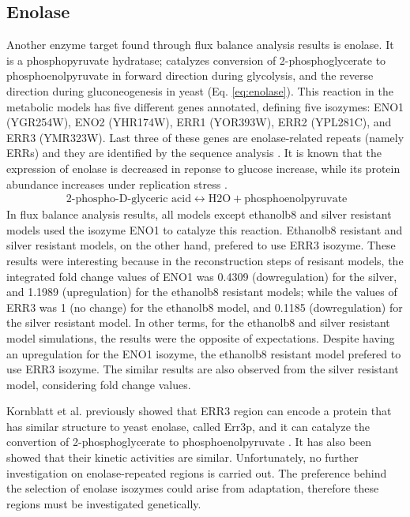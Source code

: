 \subsection{Enolase}
Another enzyme target found through flux balance analysis results is enolase. It is a phosphopyruvate hydratase; catalyzes conversion of 2-phosphoglycerate to phosphoenolpyruvate in forward direction during glycolysis, and the reverse direction during gluconeogenesis in yeast (Eq. \ref{eq:enolase}). This reaction in the metabolic models has five different genes annotated, defining five isozymes: ENO1 (YGR254W), ENO2 (YHR174W), ERR1 (YOR393W), ERR2 (YPL281C), and ERR3 (YMR323W). Last three of these genes are enolase-related repeats (namely ERRs) and they are identified by the sequence analysis \cite{pryde1995sequence}. It is known that the expression of enolase is decreased in reponse to glucose increase, while its protein abundance increases under replication stress \cite{tkach2012dissecting}.
\begin{align}
  \label{eq:enolase}
  \ \text{2-phospho-D-glyceric acid} \leftrightarrow \text{H2O} + \text{phosphoenolpyruvate}
\end{align}
In flux balance analysis results, all models except ethanolb8 and silver resistant models used the isozyme ENO1 to catalyze this reaction. Ethanolb8 resistant and silver resistant models, on the other hand, prefered to use ERR3 isozyme. These results were interesting because in the reconstruction steps of resisant models, the integrated fold change values of ENO1 was 0.4309 (dowregulation) for the silver, and 1.1989 (upregulation) for the ethanolb8 resistant models; while the values of ERR3 was 1 (no change) for the ethanolb8 model, and 0.1185 (dowregulation) for the silver resistant model. In other terms, for the ethanolb8 and silver resistant model simulations, the results were the opposite of expectations. Despite having an upregulation for the ENO1 isozyme, the ethanolb8 resistant model prefered to use ERR3 isozyme. The similar results are also observed from the silver resistant model, considering fold change values.

Kornblatt et al. previously showed that ERR3 region can encode a protein that has similar structure to yeast enolase, called Err3p, and it can catalyze the convertion of 2-phosphoglycerate to phosphoenolpyruvate \cite{kornblatt2013saccharomyces}. It has also been showed that their kinetic activities are similar. Unfortunately, no further investigation on enolase-repeated regions is carried out. The preference behind the selection of enolase isozymes could arise from adaptation, therefore these regions must be investigated genetically.

